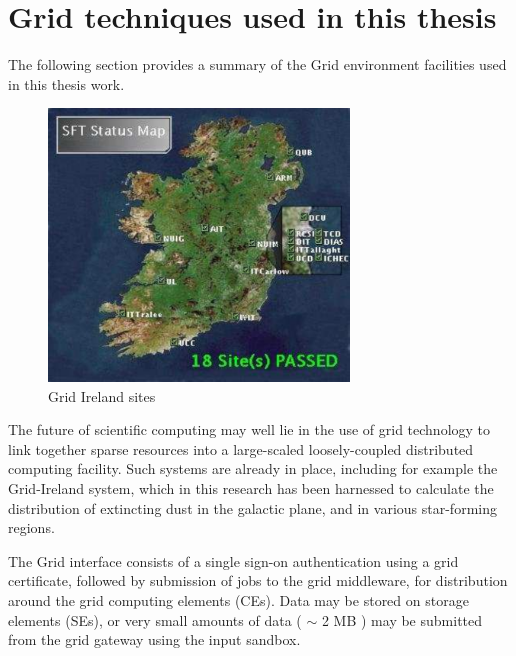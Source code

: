 \chapter{Grid techniques used in this thesis}
\label{Grid}

The following section provides a summary of the Grid environment facilities used in this thesis work.

\begin{figure}[ht]
\centering
\includegraphics[width=8cm]{GridIreland}
\caption{
Grid Ireland sites
}
\label{fig:Grid} %
\end{figure}




The future of scientific computing may well lie in the use of grid technology to link together sparse resources into a large-scaled loosely-coupled distributed computing facility. Such systems are already in place, including for example the Grid-Ireland system, which in this research has been harnessed to calculate the distribution of extincting dust in the galactic plane, and in various star-forming regions.




The Grid interface consists of a single sign-on authentication using a grid certificate, followed by submission of jobs to the grid middleware, for distribution around the grid computing elements (CEs). Data may be stored on storage elements (SEs), or very small amounts of data ( $\sim$ 2 MB ) may be submitted from the grid gateway using the input sandbox.


